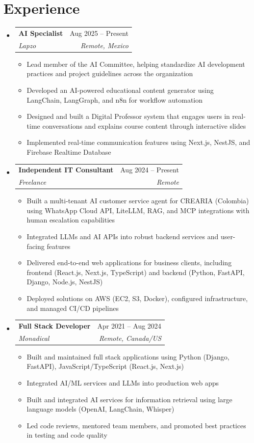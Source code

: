 \documentclass[letterpaper,11pt]{article}
\makeatletter
\newcommand{\resumeSubheading}[4]{
  \vspace{-2pt}
  \item[]
  \begin{tabular*}{\textwidth}{@{\extracolsep{\fill}}l r}
    \textbf{#1} & #2 \\
    \textit{#3} & \textit{#4} \\
  \end{tabular*}
  \vspace{-5pt}
}
\makeatother
\begin{document}
\section{Experience}
\begin{itemize}[leftmargin=0pt, itemindent=0pt, label={}, itemsep=1pt]
\resumeSubheading
{AI Specialist}{Aug 2025 -- Present}
{Lapzo}{Remote, Mexico}
\begin{itemize}[leftmargin=*, itemsep=0pt]
    \item Lead member of the AI Committee, helping standardize AI development practices and project guidelines across the organization
    \item Developed an AI-powered educational content generator using LangChain, LangGraph, and n8n for workflow automation
    \item Designed and built a Digital Professor system that engages users in real-time conversations and explains course content through interactive slides
    \item Implemented real-time communication features using Next.js, NestJS, and Firebase Realtime Database
\end{itemize}

\resumeSubheading
{Independent IT Consultant}{Aug 2024 -- Present}
{Freelance}{Remote}
\begin{itemize}[leftmargin=*, itemsep=0pt]
    \item Built a multi-tenant AI customer service agent for CREARIA (Colombia) using WhatsApp Cloud API, LiteLLM, RAG, and MCP integrations with human escalation capabilities
    \item Integrated LLMs and AI APIs into robust backend services and user-facing features
    \item Delivered end-to-end web applications for business clients, including frontend (React.js, Next.js, TypeScript) and backend (Python, FastAPI, Django, Node.js, NestJS)
    \item Deployed solutions on AWS (EC2, S3, Docker), configured infrastructure, and managed CI/CD pipelines
\end{itemize}

\resumeSubheading
{Full Stack Developer}{Apr 2021 -- Aug 2024}
{Monadical}{Remote, Canada/US}
\begin{itemize}[leftmargin=*, itemsep=0pt]
    \item Built and maintained full stack applications using Python (Django, FastAPI), JavaScript/TypeScript (React.js, Next.js)
    \item Integrated AI/ML services and LLMs into production web apps
    \item Built and integrated AI services for information retrieval using large language models (OpenAI, LangChain, Whisper)
    \item Led code reviews, mentored team members, and promoted best practices in testing and code quality
\end{itemize}


\end{itemize}
\end{document}
